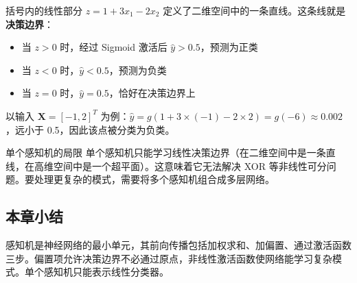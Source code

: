 括号内的线性部分 $z = 1 + 3x_1 - 2x_2$ 定义了二维空间中的一条直线。这条线就是\textbf{决策边界}：
\begin{itemize}
\item 当 $z > 0$ 时，经过 Sigmoid 激活后 $\hat{y} > 0.5$，预测为正类
\item 当 $z < 0$ 时，$\hat{y} < 0.5$，预测为负类
\item 当 $z = 0$ 时，$\hat{y} = 0.5$，恰好在决策边界上
\end{itemize}

以输入 $\mathbf{X}=[-1, 2]^T$ 为例：$\hat{y} = g(1 + 3\times(-1) - 2\times 2) = g(-6) \approx 0.002$，远小于 0.5，因此该点被分类为负类。

\begin{knowledgebox}{单个感知机的局限}
单个感知机只能学习线性决策边界（在二维空间中是一条直线，在高维空间中是一个超平面）。这意味着它无法解决 XOR 等非线性可分问题。要处理更复杂的模式，需要将多个感知机组合成多层网络。
\end{knowledgebox}

\subsection{本章小结}

感知机是神经网络的最小单元，其前向传播包括加权求和、加偏置、通过激活函数三步。偏置项允许决策边界不必通过原点，非线性激活函数使网络能学习复杂模式。单个感知机只能表示线性分类器。


